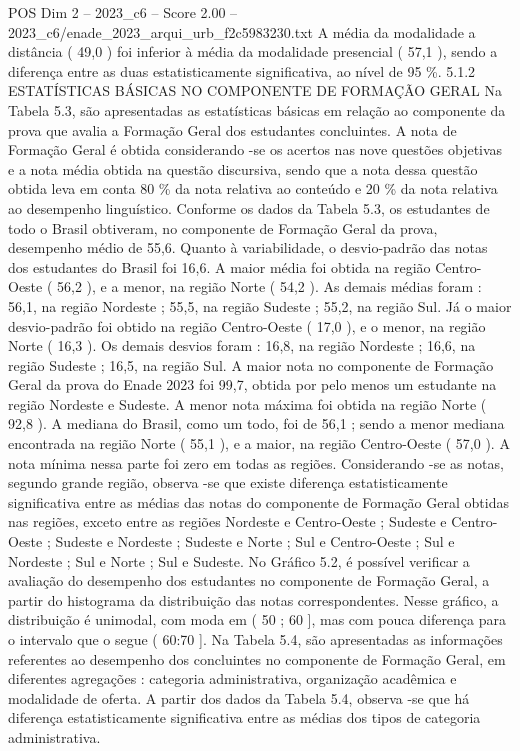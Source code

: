 \begin{textsample}{POS Dim 2 – 2023\_c6 – Score 2.00 – 2023\_c6/enade\_2023\_arqui\_urb\_f2c5983230.txt}
A média da modalidade a distância ( 49,0 ) foi inferior à média da modalidade presencial ( 57,1 ), sendo a diferença entre as duas estatisticamente significativa, ao nível de 95 \%. 5.1.2 ESTATÍSTICAS BÁSICAS NO COMPONENTE DE FORMAÇÃO GERAL Na Tabela 5.3, são apresentadas as estatísticas básicas em relação ao componente da prova que avalia a Formação Geral dos estudantes concluintes.
A nota de Formação Geral é obtida considerando -se os acertos nas nove questões objetivas e a nota média obtida na questão discursiva, sendo que a nota dessa questão obtida leva em conta 80 \% da nota relativa ao conteúdo e 20 \% da nota relativa ao desempenho linguístico.
Conforme os dados da Tabela 5.3, os estudantes de todo o Brasil obtiveram, no componente de Formação Geral da prova, desempenho médio de 55,6.
Quanto à variabilidade, o desvio-padrão das notas dos estudantes do Brasil foi 16,6.
A maior média foi obtida na região Centro-Oeste ( 56,2 ), e a menor, na região Norte ( 54,2 ).
As demais médias foram : 56,1, na região Nordeste ; 55,5, na região Sudeste ; 55,2, na região Sul.
Já o maior desvio-padrão foi obtido na região Centro-Oeste ( 17,0 ), e o menor, na região Norte ( 16,3 ).
Os demais desvios foram : 16,8, na região Nordeste ; 16,6, na região Sudeste ; 16,5, na região Sul.
A maior nota no componente de Formação Geral da prova do Enade 2023 foi 99,7, obtida por pelo menos um estudante na região Nordeste e Sudeste.
A menor nota máxima foi obtida na região Norte ( 92,8 ).
A mediana do Brasil, como um todo, foi de 56,1 ; sendo a menor mediana encontrada na região Norte ( 55,1 ), e a maior, na região Centro-Oeste ( 57,0 ).
A nota mínima nessa parte foi zero em todas as regiões.
Considerando -se as notas, segundo grande região, observa -se que existe diferença estatisticamente significativa entre as médias das notas do componente de Formação Geral obtidas nas regiões, exceto entre as regiões Nordeste e Centro-Oeste ; Sudeste e Centro-Oeste ; Sudeste e Nordeste ; Sudeste e Norte ; Sul e Centro-Oeste ; Sul e Nordeste ; Sul e Norte ; Sul e Sudeste.
No Gráfico 5.2, é possível verificar a avaliação do desempenho dos estudantes no componente de Formação Geral, a partir do histograma da distribuição das notas correspondentes.
Nesse gráfico, a distribuição é unimodal, com moda em ( 50 ; 60 ], mas com pouca diferença para o intervalo que o segue ( 60:70 ].
Na Tabela 5.4, são apresentadas as informações referentes ao desempenho dos concluintes no componente de Formação Geral, em diferentes agregações : categoria administrativa, organização acadêmica e modalidade de oferta.
A partir dos dados da Tabela 5.4, observa -se que há diferença estatisticamente significativa entre as médias dos tipos de categoria administrativa.

\end{textsample}
